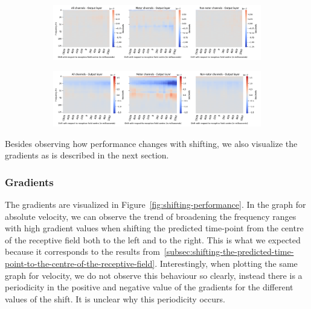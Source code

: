 \begin{figure}[!hpbp]
\begin{subfigure}[a]{\textwidth}
   \includegraphics[width=1\linewidth]{img/ch4/vel-shifted-gradients}
   \caption{}
\end{subfigure}\label{fig:vel-shifting-performance}

\begin{subfigure}[b]{\textwidth}
   \includegraphics[width=1\linewidth]{img/ch4/absVel-shifted-gradients}
   \caption{}
\end{subfigure}\label{fig:absVel-shiftig-performance}
\caption[]{}
\end{figure}\label{fig:shifting-performance}

Besides observing how performance changes with shifting, we also visualize the gradients as is described in the next section.

\subsubsection{Gradients}\label{subsubsec:across-shiftig-gradients}
The gradients are visualized in Figure~\ref{fig:shifting-performance}.
In the graph for absolute velocity, we can observe the trend of broadening the frequency ranges with high gradient values when shifting the predicted time-point from the centre of the receptive field both to the left and to the right.
This is what we expected because it corresponds to the results from~\cref{subsec:shifting-the-predicted-time-point-to-the-centre-of-the-receptive-field}.
Interestingly, when plotting the same graph for velocity, we do not observe this behaviour so clearly, instead there is a periodicity in the positive and negative value of the gradients for the different values of the shift.
It is unclear why this periodicity occurs.


